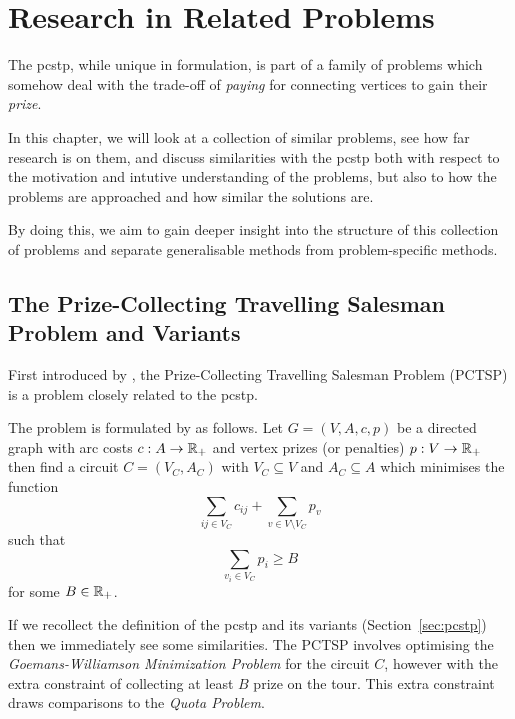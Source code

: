 \chapter{Research in Related Problems}
\label{chap:related}
The \gls{pcstp}, while unique in formulation,
is part of a family of problems which somehow deal with the trade-off of
\textit{paying} for connecting vertices to gain their \textit{prize}.

In this chapter, we will look at a collection of similar problems, see how far research is
on them, and discuss similarities with the \gls{pcstp} both with respect to the motivation and
intutive understanding of the problems, but also to how the problems are approached and
how similar the solutions are.

By doing this, we aim to gain deeper insight into the structure of this collection of problems
 and separate generalisable methods from problem-specific methods.



\section{The Prize-Collecting Travelling Salesman Problem and Variants}\label{sec:rel:tsp}
First introduced by \citet*{balas1989prize}, the Prize-Collecting Travelling Salesman Problem
(PCTSP) is a problem closely related to the \gls{pcstp}.

The problem is formulated by \citeauthor{balas1989prize} as follows. Let
$G = (V, A, c, p)$ be a directed
graph with arc costs $c: A \to \mathbb{R}_+$ and vertex prizes (or penalties) $p: V \to \mathbb{R}_+$
then find a circuit $C = (V_C, A_C)$ with $V_C \subseteq V$ and $A_C \subseteq A$ which
minimises the function
$$\sum_{ij \in V_C} c_{ij} + \sum_{v \in V \setminus V_C} p_v$$
such that
$$\sum_{v_i \in V_C} p_i \geq B$$
for some $B \in \mathbb{R}_+$.

If we recollect the definition of the \gls{pcstp} and its variants (Section~\ref{sec:pcstp}) then
we immediately see some similarities. The PCTSP involves optimising the
\textit{Goemans-Williamson Minimization Problem} for the circuit $C$, however with the extra
constraint of collecting at least $B$ prize on the tour. This extra constraint draws comparisons
to the \textit{Quota Problem}.

